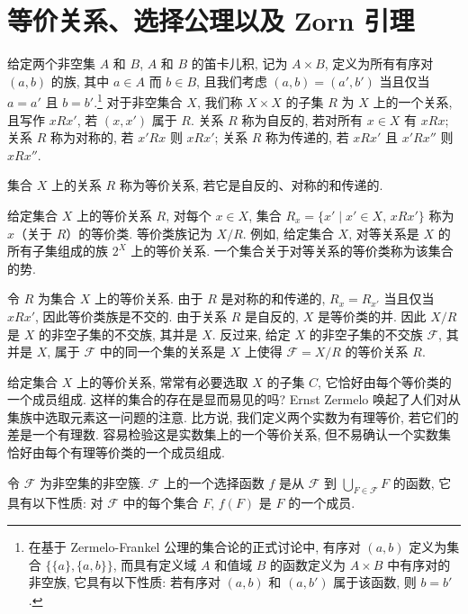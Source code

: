 \documentclass[../../main.tex]{subfiles}
\begin{document}
\section{等价关系、选择公理以及 Zorn 引理}\label{section:ch00-等价关系选择Zorn}

给定两个非空集 $A$ 和 $B$, $A$ 和 $B$ 的笛卡儿积, 记为 $A\times B$, 定义为所有有序对 $(a,b)$ 的族, 其中 $a\in A$ 而 $b\in B$, 且我们考虑 $(a,b)=(a',b')$ 当且仅当 $a=a'$ 且 $b=b'$.\footnote{在基于 Zermelo-Frankel 公理的集合论的正式讨论中, 有序对 $(a,b)$ 定义为集合 $\{\{a\},\{a,b\}\}$, 而具有定义域 $A$ 和值域 $B$ 的函数定义为 $A\times B$ 中有序对的非空族, 它具有以下性质: 若有序对 $(a,b)$ 和 $(a,b')$ 属于该函数, 则 $b=b'$.} 对于非空集合 $X$, 我们称 $X\times X$ 的子集 $R$ 为 $X$ 上的一个关系, 且写作 $xRx'$, 若 $(x,x')$ 属于 $R$. 关系 $R$ 称为自反的, 若对所有 $x\in X$ 有 $xRx$; 关系 $R$ 称为对称的, 若 $x'Rx$ 则 $xRx'$; 关系 $R$ 称为传递的, 若 $xRx'$ 且 $x'Rx''$ 则 $xRx''$.

\begin{definition}[等价关系]\label{definition:ch00-等价关系}
集合 $X$ 上的关系 $R$ 称为等价关系, 若它是自反的、对称的和传递的.
\end{definition}

给定集合 $X$ 上的等价关系 $R$, 对每个 $x\in X$, 集合 $R_{x}=\{x'\mid x'\in X,\,xRx'\}$ 称为 $x$（关于 $R$）的等价类. 等价类族记为 $X/R$. 例如, 给定集合 $X$, 对等关系是 $X$ 的所有子集组成的族 $2^{X}$ 上的等价关系. 一个集合关于对等关系的等价类称为该集合的势.

令 $R$ 为集合 $X$ 上的等价关系. 由于 $R$ 是对称的和传递的, $R_{x}=R_{x'}$ 当且仅当 $xRx'$, 因此等价类族是不交的. 由于关系 $R$ 是自反的, $X$ 是等价类的并. 因此 $X/R$ 是 $X$ 的非空子集的不交族, 其并是 $X$. 反过来, 给定 $X$ 的非空子集的不交族 $\mathcal{F}$, 其并是 $X$, 属于 $\mathcal{F}$ 中的同一个集的关系是 $X$ 上使得 $\mathcal{F}=X/R$ 的等价关系 $R$.

给定集合 $X$ 上的等价关系, 常常有必要选取 $X$ 的子集 $C$, 它恰好由每个等价类的一个成员组成. 这样的集合的存在是显而易见的吗? Ernst Zermelo 唤起了人们对从集族中选取元素这一问题的注意. 比方说, 我们定义两个实数为有理等价, 若它们的差是一个有理数. 容易检验这是实数集上的一个等价关系, 但不易确认一个实数集恰好由每个有理等价类的一个成员组成.

\begin{definition}[选择函数]\label{definition:ch00-选择函数}
令 $\mathcal{F}$ 为非空集的非空簇. $\mathcal{F}$ 上的一个选择函数 $f$ 是从 $\mathcal{F}$ 到 $\bigcup_{F\in\mathcal{F}}F$ 的函数, 它具有以下性质: 对 $\mathcal{F}$ 中的每个集合 $F$, $f(F)$ 是 $F$ 的一个成员.
\end{definition}
\end{document}

